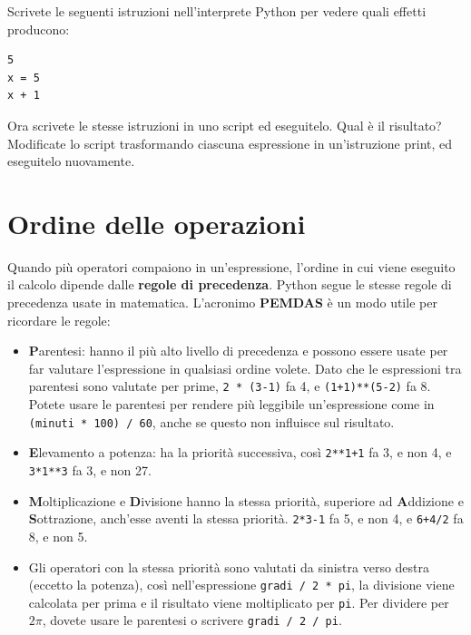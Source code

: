 \documentclass[10pt]{book}
\begin{document}
\vspace{0.2in}
\begin{exercise}

Scrivete le seguenti istruzioni nell'interprete Python per vedere quali effetti producono:

\begin{verbatim}
5
x = 5
x + 1
\end{verbatim}
%
Ora scrivete le stesse istruzioni in uno script ed eseguitelo. Qual è il risultato? Modificate lo script trasformando ciascuna espressione in un'istruzione print, ed eseguitelo nuovamente.
\end{exercise}


\section{Ordine delle operazioni}

Quando più operatori compaiono in un'espressione, l'ordine in cui viene eseguito il calcolo dipende dalle {\bf regole di precedenza}. Python segue le stesse regole di precedenza usate in matematica. L'acronimo {\bf PEMDAS} è un modo utile per ricordare le regole:

\begin{itemize}

\item {\bf P}arentesi: hanno il più alto livello di precedenza e possono  essere usate per far valutare l'espressione in qualsiasi ordine volete.    Dato che le espressioni tra parentesi sono valutate per prime, {\tt 2 * (3-1)} fa 4, e {\tt (1+1)**(5-2)} fa 8. Potete usare le parentesi per rendere più leggibile un'espressione come in {\tt (minuti * 100) / 60}, anche se questo non influisce sul risultato.

\item {\bf E}levamento a potenza: ha la priorità successiva, così
{\tt 2**1+1} fa 3, e non 4, e {\tt 3*1**3} fa 3, e non 27.

\item {\bf M}oltiplicazione e {\bf D}ivisione hanno la stessa priorità, superiore ad {\bf A}ddizione e {\bf S}ottrazione, anch'esse aventi la stessa priorità. {\tt 2*3-1} fa 5, e non 4, e {\tt 6+4/2} fa 8, e non 5.

\item Gli operatori con la stessa priorità sono valutati da sinistra verso destra (eccetto la potenza), così nell'espressione {\tt gradi / 2 * pi}, la divisione viene calcolata per prima e il risultato viene moltiplicato per {\tt pi}.  Per dividere per $2 \pi$, dovete usare le parentesi o scrivere {\tt gradi / 2 / pi}.

\end{itemize}
\end{document}
